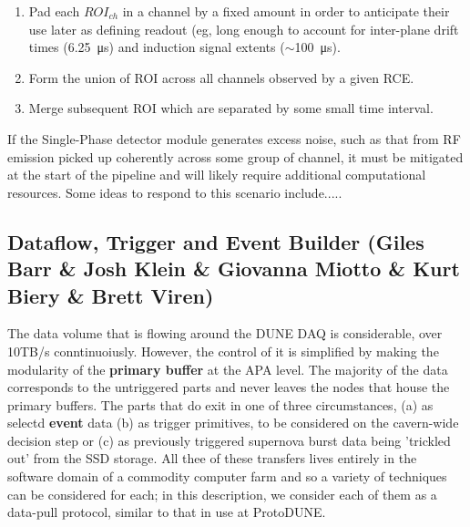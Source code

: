 \begin{enumerate}
\item Pad each $ROI_{ch}$ in a channel by a fixed amount in order to
  anticipate their use later as defining readout (eg, long enough to
  account for inter-plane drift times (\SI{6.25}{\micro\second}) and
  induction signal extents ($\sim$\SI{100}{\micro\second}).
\item Form the union of ROI across all channels observed by a given RCE.
\item Merge subsequent ROI which are separated by some small time
  interval.
\end{enumerate}

If the Single-Phase detector module generates excess noise, such as
that from RF emission picked up coherently across some group of
channel, it must be mitigated at the start of the pipeline and will
likely require additional computational resources.  Some ideas to
respond to this scenario include.....



\subsection{Dataflow, Trigger and Event Builder (Giles Barr \& Josh Klein \& Giovanna Miotto \& Kurt Biery \& Brett Viren)}
\label{sec:fdsp-daq-hlt}


The data volume that is flowing around the DUNE DAQ is considerable,
over 10TB/s conntinuoiusly.  However, the control of it is simplified
by making the modularity of the {\bf primary buffer} at the APA level.
The majority of the data corresponds to the untriggered parts and
never leaves the nodes that house the primary buffers.  The parts that
do exit in one of three circumstances, (a) as selectd {\bf event} data
(b) as trigger primitives, to be considered on the cavern-wide
decision step or (c) as previously triggered supernova burst data
being 'trickled out' from the SSD storage.  All thee of these
transfers lives entirely in the software domain of a commodity
computer farm and so a variety of techniques can be considered for
each; in this description, we consider each of them as a data-pull
protocol, similar to that in use at ProtoDUNE.

